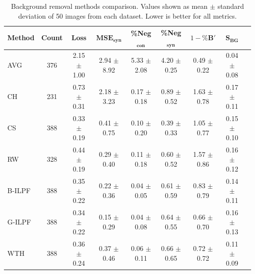 \documentclass[iucr,review]{iucrjournals}
\begin{document}
\begin{table}[t]
\caption{Background removal methods comparison. Values shown as mean $\pm$ standard deviation of 50 images from each dataset.
Lower is better for all metrics.}
\label{tab:method_performance_new}
\centering
\small
\setlength{\tabcolsep}{3pt}
\renewcommand{\arraystretch}{1.1}
\begin{tabular}{@{}lcccccccc@{}}
\toprule
\textbf{Method} & \textbf{Count} & \textbf{Loss} & $\mathbf{MSE}_{\mathbf{syn}}$ & \textbf{\%Neg$_{\mathbf{con}}$} & \textbf{\%Neg$_{\mathbf{syn}}$} & \textbf{$1-\%\mathbf{B}'$} & \textbf{$\mathbf{S}_{\mathbf{BG}}$} \\ \midrule
AVG & 376 & 2.15 $\pm$ 1.00 & 2.94 $\pm$ 8.92 & 5.33 $\pm$ 2.08 & 4.20 $\pm$ 0.25 & 0.49 $\pm$ 0.22 & 0.04 $\pm$ 0.08 \\
CH & 231 & 0.73 $\pm$ 0.31 & 2.18 $\pm$ 3.23 & 0.17 $\pm$ 0.18 & 0.89 $\pm$ 0.52 & 1.63 $\pm$ 0.78 & 0.17 $\pm$ 0.11 \\
CS & 388 & 0.33 $\pm$ 0.19 & 0.41 $\pm$ 0.75 & 0.10 $\pm$ 0.20 & 0.39 $\pm$ 0.33 & 1.05 $\pm$ 0.77 & 0.15 $\pm$ 0.10 \\
RW & 328 & 0.44 $\pm$ 0.19 & 0.29 $\pm$ 0.40 & 0.11 $\pm$ 0.18 & 0.60 $\pm$ 0.52 & 1.57 $\pm$ 0.86 & 0.16 $\pm$ 0.12 \\
B-ILPF & 388 & 0.35 $\pm$ 0.22 & 0.22 $\pm$ 0.36 & 0.04 $\pm$ 0.05 & 0.61 $\pm$ 0.59 & 0.83 $\pm$ 0.79 & 0.14 $\pm$ 0.11 \\
G-ILPF & 388 & 0.34 $\pm$ 0.22 & 0.15 $\pm$ 0.29 & 0.04 $\pm$ 0.08 & 0.64 $\pm$ 0.55 & 0.66 $\pm$ 0.70 & 0.16 $\pm$ 0.13 \\
WTH & 388 & 0.36 $\pm$ 0.24 & 0.37 $\pm$ 0.46 & 0.06 $\pm$ 0.11 & 0.66 $\pm$ 0.65 & 0.72 $\pm$ 0.72 & 0.11 $\pm$ 0.09 \\
\bottomrule
\end{tabular}
\end{table}
\end{document}
